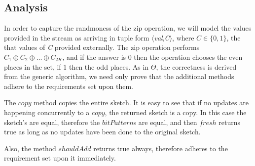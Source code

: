 \subsection{Analysis}
In order to capture the randmoness of the zip operation, we will model the values provided in the stream
as arriving in tuple form $\langle$\emph{val},\emph{C}$\rangle$, where $C\in\{0,1\}$, the that values of
\emph{C} provided externally. The zip operation performs $C_1 \oplus C_2 \oplus \dots \oplus C_{2K}$, and if
the answer is 0 then the operation chooses the even places in the set, if 1 then the odd places. As in $\Theta$,
the correctness is derived from the generic algorithm, we need only prove that the additional methods adhere 
to the requirements set upon them.

The $copy$ method copies the entire sketch. It is easy to see that if no updates are happening concurrently
to a $copy$, the returned sketch is a copy. In this case the sketch's are equal, therefore the $bitPattern$s
are equal, and then $fresh$ returns true as long as no updates have been done to the original sketch.

Also, the method $shouldAdd$ returns true always, therefore adheres to the requirement set upon it
immediately.